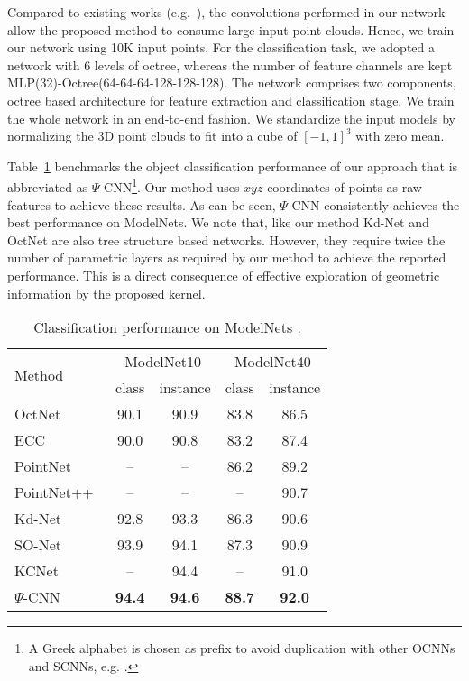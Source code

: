 \documentclass[10pt,twocolumn,letterpaper]{article}
\begin{document}
{Compared to existing works  
(e.g.~\cite{qi2017pointnet,qi2017pointnetplusplus,shen2018mining,simonovsky2017dynamic}), the  convolutions performed in our network allow the proposed method to consume large input point clouds. Hence, we train our network using 10K input points. For the classification task, we adopted a network with 6 levels of octree, whereas the number of feature channels are kept MLP(32)-Octree(64-64-64-128-128-128). The network comprises two components, octree based architecture for feature extraction and classification stage. We train the whole network in an end-to-end fashion. We  standardize the input models by normalizing the 3D point
clouds to fit into a cube of $[-1,1]^3$ with zero mean.


Table~\ref{compare2Others} benchmarks the object classification performance of our approach that is abbreviated as $\Psi$-CNN\footnote{A Greek alphabet is chosen as prefix to avoid duplication with other OCNNs and SCNNs, e.g. \cite{liu2015sparse,parashar2017scnn,wang2017cnn}.}.  Our method uses $xyz$ coordinates of points as raw features to achieve these results.
As can be seen, $\Psi$-CNN consistently achieves the best performance on ModelNets. 
We note that, like our method Kd-Net \cite{klokov2017escape} and OctNet \cite{riegler2017octnet} are also tree structure based networks. However, they require twice the number of parametric layers as required by our method to achieve the reported performance. 
This is a direct consequence of effective exploration of geometric information by the proposed kernel. 


\begin{table}[t]
\centering
\caption{Classification performance on ModelNets \cite{wu20153d}.}\label{compare2Others}
\begin{tabular}{l|c|c|c|c}
  \hline
\multirow{ 2}{*}{Method}&  \multicolumn{2}{c|}{ModelNet10} & \multicolumn{2}{c}{ModelNet40} \\
  \cline{2-5}
&class & instance & class & instance \\
  \hline
  \hline
  OctNet~\cite{riegler2017octnet} &90.1 & 90.9 & 83.8 & 86.5 \\
  ECC~\cite{simonovsky2017dynamic}&90.0&90.8 & 83.2&87.4\\
  PointNet~\cite{qi2017pointnet} & -- & -- & 86.2 &89.2 \\
  PointNet++~\cite{qi2017pointnetplusplus}& -- & -- & --  &90.7 \\
Kd-Net~\cite{klokov2017escape} & 92.8 &93.3 &86.3 &90.6\\
SO-Net~\cite{li2018so}&93.9 &94.1 &87.3 &90.9 \\
  KCNet~\cite{shen2018mining} &--& 94.4 &--& 91.0\\
  \hline
$\Psi$-CNN &  \textbf{94.4} & \textbf{94.6} & \textbf{88.7}  & \textbf{92.0}  \\
\hline
\end{tabular}
\vspace{-3mm}
\end{table}

}
\end{document}
